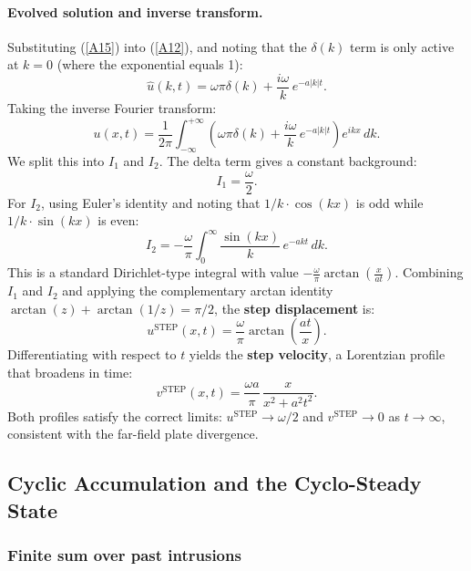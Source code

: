 \documentclass{article}
\newcommand{\infint}{\displaystyle\int_{-\infty}^{+\infty}}
\begin{document}
\paragraph{Evolved solution and inverse transform.}
Substituting (\ref{A15}) into (\ref{A12}), and noting that the $\delta(k)$
term is only active at $k=0$ (where the exponential equals 1):
\begin{equation}
\hat{u}(k,t) = \omega\pi\delta(k) + \frac{i\omega}{k}\,e^{-a|k|t}.
\label{A16}
\end{equation}
Taking the inverse Fourier transform:
\begin{equation}
u(x,t) = \frac{1}{2\pi}\infint
  \left(\omega\pi\delta(k) + \frac{i\omega}{k}\,e^{-a|k|t}\right)e^{ikx}\,dk.
\label{A17}
\end{equation}
We split this into $I_1$ and $I_2$. The delta term gives a constant background:
\begin{equation}
I_1 = \frac{\omega}{2}.
\label{A18}
\end{equation}
For $I_2$, using Euler's identity and noting that $1/k\cdot\cos(kx)$ is odd
while $1/k\cdot\sin(kx)$ is even:
\begin{equation}
I_2 = -\frac{\omega}{\pi}\int_0^{\infty}\frac{\sin(kx)}{k}\,e^{-akt}\,dk.
\label{A19}
\end{equation}
This is a standard Dirichlet-type integral with value
$-\tfrac{\omega}{\pi}\arctan\!\left(\tfrac{x}{at}\right)$.
Combining $I_1$ and $I_2$ and applying the complementary arctan identity
$\arctan(z)+\arctan(1/z)=\pi/2$, the \textbf{step displacement} is:
\begin{equation}
\boxed{u^{\text{STEP}}(x,t) = \frac{\omega}{\pi}\arctan\!\left(\frac{at}{x}\right).}
\label{A22}
\end{equation}
Differentiating with respect to $t$ yields the \textbf{step velocity},
a Lorentzian profile that broadens in time:
\begin{equation}
v^{\text{STEP}}(x,t) = \frac{\omega a}{\pi}\,\frac{x}{x^2 + a^2t^2}.
\label{A23}
\end{equation}
Both profiles satisfy the correct limits: $u^{\text{STEP}}\to\omega/2$ and
$v^{\text{STEP}}\to 0$ as $t\to\infty$, consistent with the far-field plate
divergence.

\subsection{Cyclic Accumulation and the Cyclo-Steady State}

\subsubsection{Finite sum over past intrusions}
\end{document}
